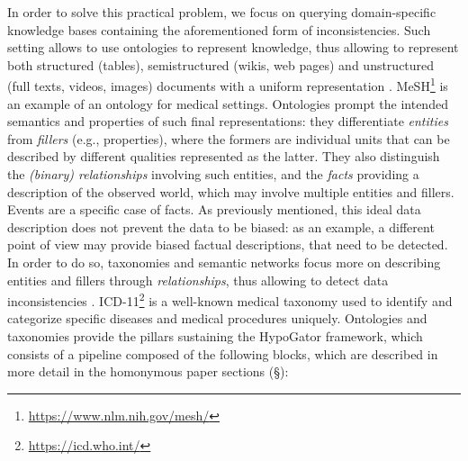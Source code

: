 In order to solve this practical problem, we focus on querying domain-specific knowledge bases containing the aforementioned form of inconsistencies. Such setting allows to use ontologies to represent knowledge, thus allowing to represent both structured (tables), semistructured (wikis, web pages) and unstructured (full texts, videos, images) documents with a uniform representation \cite{DeepDivePhD,Chen14}. MeSH\footnote{\url{https://www.nlm.nih.gov/mesh/}} is an example of an ontology for medical settings. Ontologies prompt the intended semantics and properties of such final representations: they differentiate \textit{entities} from \textit{fillers} (e.g., properties), where the formers are individual units that can be described by different qualities represented as the latter. They also distinguish the \textit{(binary) relationships} involving such entities, and the \textit{facts} providing a description of the observed world, which may involve multiple entities and fillers. Events are a specific case of facts. As previously mentioned, this ideal data description does not prevent the data to be biased: as an example, a different point of view may provide biased factual descriptions, that need to be detected. In order to do so, taxonomies and semantic networks focus more on describing entities and fillers through \textit{relationships}, thus allowing to detect data inconsistencies \cite{Lependu11}.  ICD-11\footnote{\url{https://icd.who.int/}} is a well-known medical taxonomy used to identify and categorize specific diseases and medical procedures uniquely. Ontologies and taxonomies provide the pillars sustaining the HypoGator framework, which consists of a pipeline composed of the following blocks, which are described in more detail in the homonymous paper sections (\S):
	

